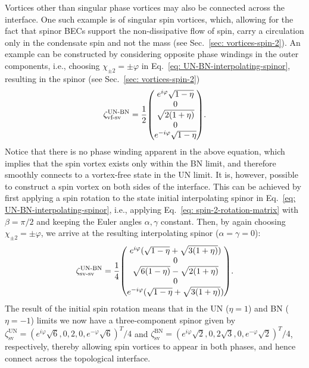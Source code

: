 Vortices other than singular phase vortices may also be connected across the
interface.
One such example is of singular spin vortices, which, allowing for the fact that
spinor BECs support the non-dissipative flow of spin, carry a circulation only
in the condensate spin and not the mass (see Sec.~\ref{sec: vortices-spin-2}).
An example can be constructed by considering opposite phase windings in the
outer components, i.e., choosing \(\chi_{\pm 2} = \pm \varphi \) in
Eq.~\eqref{eq: UN-BN-interpolating-spinor}, resulting in the spinor
(see Sec.~\ref{sec: vortices-spin-2})
\begin{align}\label{eq: UN-BN-vf-sv}
    \zeta_\text{vf-sv}^\text{UN-BN} = \frac{1}{2}\mqty(
        e^{i\varphi}\sqrt{1 - \eta} \\
        0 \\
        \sqrt{2(1+\eta)} \\
        0 \\
        e^{-i\varphi}\sqrt{1 - \eta}
    ).
\end{align}
Notice that there is no phase winding apparent in the above equation, which
implies that the spin vortex exists only within the BN limit, and therefore
smoothly connects to a vortex-free state in the UN limit.
It is, however, possible to construct a spin vortex on both sides of the
interface.
This can be achieved by first applying a spin rotation to the state initial
interpolating spinor in Eq.~\eqref{eq: UN-BN-interpolating-spinor}, i.e.,
applying Eq.~\eqref{eq: spin-2-rotation-matrix} with \(\beta = \pi/2\) and
keeping the Euler angles \(\alpha, \gamma \) constant.
Then, by again choosing \(\chi_{\pm 2} = \pm \varphi \), we arrive at the
resulting interpolating spinor (\(\alpha = \gamma = 0\)):
\begin{align}\label{eq: UN-BN-sv-sv}
    \zeta_\text{sv-sv}^\text{UN-BN} = \frac{1}{4}\mqty(
        e^{i\varphi}(\sqrt{1 - \eta} + \sqrt{3(1+\eta)}) \\
        0 \\
        \sqrt{6(1-\eta)} - \sqrt{2(1+\eta)} \\
        0 \\
        e^{-i\varphi}(\sqrt{1 - \eta} + \sqrt{3(1+\eta)})
    ).
\end{align}
The result of the initial spin rotation means that in the UN (\(\eta = 1\)) and
BN (\(\eta = -1\)) limits we now have a three-component spinor given by
\(\zeta^\text{UN}_\text{sv} = {(e^{i\varphi}\sqrt{6}, 0, 2, 0,
e^{-\varphi}\sqrt{6})}^T/4\) and
\(\zeta^\text{BN}_\text{sv} = {(e^{i\varphi}\sqrt{2}, 0, 2\sqrt{3}, 0,
e^{-\varphi}\sqrt{2})}^T/4\), respectively, thereby allowing spin vortices to
appear in both phases, and hence connect across the topological interface.

